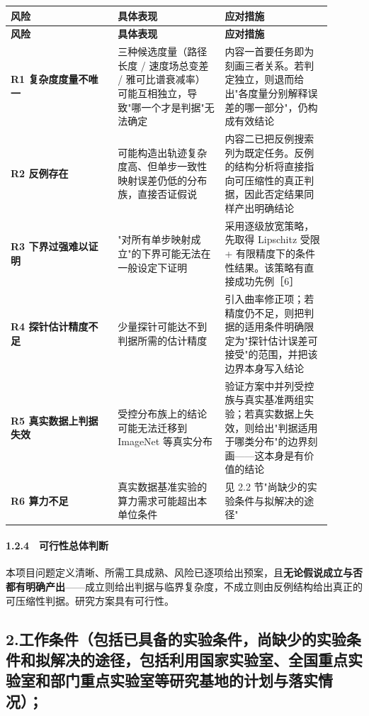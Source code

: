 \documentclass[12pt,a4paper]{ctexart}
\begin{document}
\begin{longtable}{|>{\raggedright\arraybackslash}p{0.300\linewidth}|>{\raggedright\arraybackslash}p{0.300\linewidth}|>{\raggedright\arraybackslash}p{0.300\linewidth}|}
\hline
\textbf{风险} & \textbf{具体表现} & \textbf{应对措施} \\
\hline
\endfirsthead
\hline
\textbf{风险} & \textbf{具体表现} & \textbf{应对措施} \\
\hline
\endhead
\textbf{R1 复杂度度量不唯一} & 三种候选度量（路径长度 / 速度场总变差 / 雅可比谱衰减率）可能互相独立，导致"哪一个才是判据"无法确定 & 内容一首要任务即为刻画三者关系。若判定独立，则退而给出"各度量分别解释误差的哪一部分"，仍构成有效结论 \\
\hline
\textbf{R2 反例存在} & 可能构造出轨迹复杂度高、但单步一致性映射误差仍低的分布族，直接否证假说 & 内容二已把反例搜索列为既定任务。反例的结构分析将直接指向可压缩性的真正判据，因此否定结果同样产出明确结论 \\
\hline
\textbf{R3 下界过强难以证明} & "对所有单步映射成立"的下界可能无法在一般设定下证明 & 采用逐级放宽策略，先取得 Lipschitz 受限 + 有限精度下的条件性结果。该策略有直接成功先例［6］ \\
\hline
\textbf{R4 探针估计精度不足} & 少量探针可能达不到判据所需的估计精度 & 引入曲率修正项；若精度仍不足，则把判据的适用条件明确限定为"探针估计误差可接受"的范围，并把该边界本身写入结论 \\
\hline
\textbf{R5 真实数据上判据失效} & 受控分布族上的结论可能无法迁移到 ImageNet 等真实分布 & 验证方案中并列受控族与真实基准两组实验；若真实数据上失效，则给出"判据适用于哪类分布"的边界刻画——这本身是有价值的结论 \\
\hline
\textbf{R6 算力不足} & 真实数据基准实验的算力需求可能超出本单位条件 & 见 2.2 节"尚缺少的实验条件与拟解决的途径" \\
\hline
\end{longtable}

\paragraph{1.2.4　可行性总体判断}

本项目问题定义清晰、所需工具成熟、风险已逐项给出预案，且\textbf{无论假说成立与否都有明确产出}——成立则给出判据与临界复杂度，不成立则由反例结构给出真正的可压缩性判据。研究方案具有可行性。

\subsection*{2.工作条件（包括已具备的实验条件，尚缺少的实验条件和拟解决的途径，包括利用国家实验室、全国重点实验室和部门重点实验室等研究基地的计划与落实情况）；}
\end{document}
